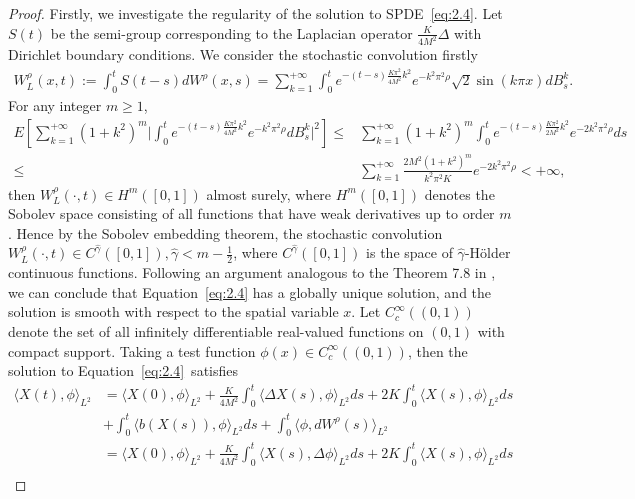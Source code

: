\documentclass[11pt]{article}
\numberwithin{equation}{section}%
\numberwithin{figure}{section}%
\theoremstyle{remark}
\begin{document}
	\begin{proof}Firstly, we investigate the regularity of the solution to SPDE~\eqref{eq:2.4}. Let $S(t)$ be the semi-group corresponding to the Laplacian operator $\frac{K}{4M^{2}}\Delta$ with Dirichlet boundary conditions. We consider the stochastic convolution firstly
		\begin{align*}
			W_{L}^{\rho}(x,t):=\int_{0}^{t}S(t-s)dW^{\rho}(x,s)=\sum_{k=1}^{+\infty}\int_{0}^{t} e^{-(t-s)\frac{K\pi^{2}}{4M^{2}}k^{2}}e^{-k^{2}\pi^{2}\rho}\sqrt{2}\sin(k\pi x)dB_{s}^{k}.
		\end{align*}
		For any integer $m\geq 1$,
		\begin{align*}
		E\left[\sum_{k=1}^{+\infty}(1+k^{2})^{m}\vert\int_{0}^{t} e^{-(t-s)\frac{K\pi^{2}}{4M^{2}}k^{2}}e^{-k^{2}\pi^{2}\rho}dB_{s}^{k}\vert^{2}\right]
		\leq&\sum_{k=1}^{+\infty}(1+k^{2})^{m}\int_{0}^{t}e^{-(t-s)\frac{K\pi^{2}}{2M^{2}}k^{2}}e^{-2k^{2}\pi^{2}\rho}ds\\
		\leq&\sum_{k=1}^{+\infty}\frac{2M^{2}(1+k^{2})^{m}}{k^{2}\pi^{2}K}e^{-2k^{2}\pi^{2}\rho}<+\infty,
	    \end{align*}
	    then $W_{L}^{\rho}(\cdot,t)\in H^{m}([0,1])$ almost surely, where $ H^{m}([0,1])$ denotes the Sobolev space consisting of all functions that have weak derivatives up to order $m$. Hence by the Sobolev embedding theorem, the stochastic convolution $W_{L}^{\rho}(\cdot,t)\in C^{\hat{\gamma}}([0,1]),\hat{\gamma}<m-\frac{1}{2}$, where $C^{\hat{\gamma}}([0,1])$ is the space of $\hat{\gamma}$-H\"{o}lder continuous functions. Following an argument analogous to the Theorem 7.8 in \cite{Hairer1998document}, we can conclude that Equation~\eqref{eq:2.4} has a globally unique solution, and the solution is smooth with respect to the spatial variable $x$. Let $C_{c}^{\infty}((0,1))$ denote the set of all infinitely differentiable real-valued functions on $(0,1)$ with compact support. Taking a test function $\phi(x)\in C_{c}^{\infty}((0,1))$, then the solution to Equation~\eqref{eq:2.4}~satisfies
		\begin{align*}
			\langle X(t),\phi\rangle_{L^{2}}&=\langle X(0),\phi\rangle_{L^{2}}+\frac{K}{4M^{2}}\int_{0}^{t} \langle \Delta X(s),\phi\rangle_{L^{2}}ds+2K\int_{0}^{t} \langle X(s),\phi\rangle_{L^{2}}ds\\
			&+\int_{0}^{t}\langle b(X(s)),\phi\rangle_{L^{2}}ds+\int_{0}^{t}\langle \phi,dW^{\rho}(s)\rangle_{L^{2}}\\
			&=\langle X(0),\phi\rangle_{L^{2}}+\frac{K}{4M^{2}}\int_{0}^{t} \langle X(s),\Delta \phi\rangle_{L^{2}}ds+2K\int_{0}^{t} \langle X(s),\phi\rangle_{L^{2}}ds\\

\end{align*}
\end{proof}
\end{document}

